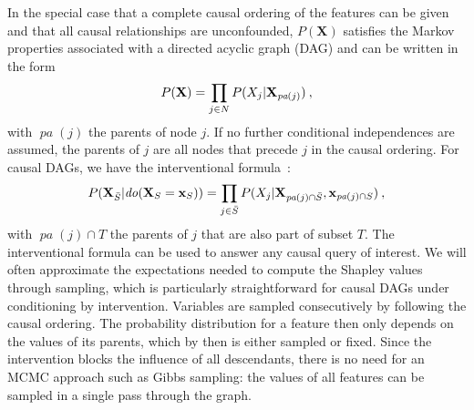 \documentclass{article}
\newcommand{\vX}{\mathbf{X}}
\newcommand{\vx}{\mathbf{x}}
\newcommand{\dodo}{\mathit{do}}
\newcommand{\lvdo}[1]{\dodo(\vX_{#1} = \vx_{#1})}
\newcommand{\pa}{\mathop{\textit{pa}}}
\newcommand{\spa}{\mathop{\textit{\scriptsize pa}}}
\newcommand{\allfeatures}{{N}}
\begin{document}
In the special case that a complete causal ordering of the features can be given and that all causal relationships are unconfounded, $P(\vX)$ satisfies the Markov properties associated with a directed acyclic graph (DAG) and can be written in the form
\[
P(\vX) = \prod_{j \in \allfeatures} P(X_j|\vX_{\spa(j)}) \: ,
\]
with $\pa(j)$ the parents of node $j$. If no further conditional independences are assumed, the parents of $j$ are all nodes that precede $j$ in the causal ordering. For causal DAGs, we have the interventional formula~\cite{lauritzen2002chain}:
\begin{equation}
P(\vX_{\bar{S}}|\lvdo{S}) = \prod_{j \in \bar{S}} P(X_j|\vX_{\spa(j)  \cap \bar{S}},\vx_{\spa(j) \cap S}) \: ,
\label{eq:interventional}
\end{equation}
with $\pa(j) \cap T$ the parents of $j$ that are also part of subset $T$. The interventional formula can be used to answer any causal query of interest. We will often approximate the expectations needed to compute the Shapley values through sampling, which is particularly straightforward for causal DAGs under conditioning by intervention. Variables are sampled consecutively by following the causal ordering. The probability distribution for a feature then only depends on the values of its parents, which by then is either sampled or fixed. Since the intervention blocks the influence of all descendants, there is no need for an MCMC approach such as Gibbs sampling: the values of all features can be sampled in a single pass through the graph.

\end{document}
